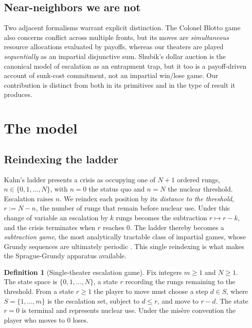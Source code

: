 \documentclass[11pt]{article}
\theoremstyle{plain}
\theoremstyle{definition}
\newtheorem{definition}[theorem]{Definition}
\theoremstyle{remark}
\begin{document}
\subsection{Near-neighbors we are not}
Two adjacent formalisms warrant explicit distinction. The Colonel Blotto
game \citep{roberson2006} also concerns conflict across multiple
fronts, but its moves are \emph{simultaneous} resource allocations evaluated
by payoffs, whereas our theaters are played \emph{sequentially} as an
impartial disjunctive sum. Shubik's dollar auction \citep{shubik1971} is the
canonical model of escalation as an entrapment trap, but it too is a
payoff-driven account of sunk-cost commitment, not an impartial win/lose
game. Our contribution is distinct from both in its primitives and in the
type of result it produces.

\section{The model}\label{sec:model}

\subsection{Reindexing the ladder}
Kahn's ladder \citep{kahn1965} presents a crisis as occupying one of $N+1$
ordered rungs, $n\in\{0,1,\dots,N\}$, with $n=0$ the status quo and $n=N$
the nuclear threshold. Escalation raises $n$. We reindex each position by
its \emph{distance to the threshold}, $r := N - n$, the number of rungs that
remain before nuclear use. Under this change of variable an escalation by
$k$ rungs becomes the subtraction $r \mapsto r-k$, and the crisis terminates
when $r$ reaches $0$. The ladder thereby becomes a \emph{subtraction game},
the most analytically tractable class of impartial games, whose Grundy
sequences are ultimately periodic \citep{guysmith1956}. This single
reindexing is what makes the Sprague-Grundy apparatus
\citep{sprague1935, grundy1939, conway1976} available.

\begin{definition}[Single-theater escalation game]\label{def:single}
Fix integers $m\ge 1$ and $N\ge 1$. The state space is
$\{0,1,\dots,N\}$, a state $r$ recording the rungs remaining to the
threshold. From a state $r\ge 1$ the player to move must choose a step
$d\in S$, where $S=\{1,\dots,m\}$ is the escalation set, subject to
$d\le r$, and move to $r-d$. The state $r=0$ is terminal and represents
nuclear use. Under the mis\`ere convention the player who moves to $0$ loses.
\end{definition}
\end{document}
